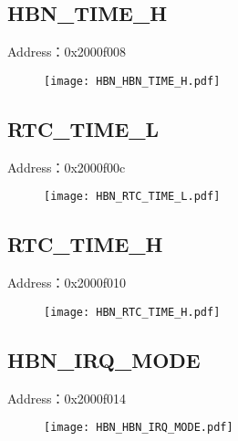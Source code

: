\subsection{HBN\_TIME\_H}
\label{HBN-HBN-TIME-H}
Address：0x2000f008
 \begin{figure}[H]
\texttt{[image: HBN\_HBN\_TIME\_H.pdf]}
\end{figure}

\subsection{RTC\_TIME\_L}
\label{HBN-RTC-TIME-L}
Address：0x2000f00c
 \begin{figure}[H]
\texttt{[image: HBN\_RTC\_TIME\_L.pdf]}
\end{figure}

\subsection{RTC\_TIME\_H}
\label{HBN-RTC-TIME-H}
Address：0x2000f010
 \begin{figure}[H]
\texttt{[image: HBN\_RTC\_TIME\_H.pdf]}
\end{figure}

\subsection{HBN\_IRQ\_MODE}
\label{HBN-HBN-IRQ-MODE}
Address：0x2000f014
 \begin{figure}[H]
\texttt{[image: HBN\_HBN\_IRQ\_MODE.pdf]}
\end{figure}

